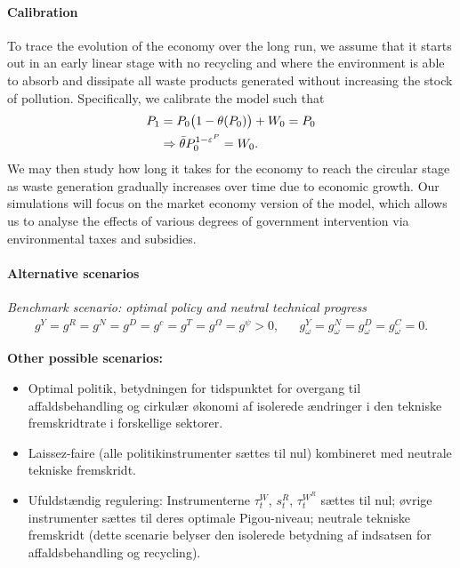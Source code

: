 \paragraph{Calibration}

To trace the evolution of the economy over the long run, we assume that it starts out in an early linear stage with no recycling and where the environment is able to absorb and dissipate all waste products generated without increasing the stock of pollution. Specifically, we calibrate the model such that
\begin{align}
P_1 &= P_0\bigl(1-\theta(P_0)\bigr) + W_0 = P_0
\notag \\
&\Rightarrow \bar\theta P_0^{1-\varepsilon^P} = W_0.
\label{eq:quant:calibration}
\end{align}
We may then study how long it takes for the economy to reach the circular stage as waste generation gradually increases over time due to economic growth. Our simulations will focus on the market economy version of the model, which allows us to analyse the effects of various degrees of government intervention via environmental taxes and subsidies.

\paragraph{Alternative scenarios}

\textit{Benchmark scenario: optimal policy and neutral technical progress}
\begin{align}
g^Y = g^R = g^N = g^D = g^c = g^T = g^\Omega = g^\psi > 0,
&&
g_\omega^Y = g_\omega^N = g_\omega^D = g_\omega^C = 0.
\label{eq:quant:benchmark}
\end{align}

\textbf{Other possible scenarios:}
\begin{itemize}
\item Optimal politik, betydningen for tidspunktet for overgang til affaldsbehandling og cirkul\ae r \o konomi af isolerede \ae ndringer i den tekniske fremskridtrate i forskellige sektorer.
\item Laissez-faire (alle politikinstrumenter s\ae ttes til nul) kombineret med neutrale tekniske fremskridt.
\item Ufuldst\ae ndig regulering: Instrumenterne $\tau_t^W$, $s_t^R$, $\tau_t^{W^R}$ s\ae ttes til nul; \o vrige instrumenter s\ae ttes til deres optimale Pigou-niveau; neutrale tekniske fremskridt (dette scenarie belyser den isolerede betydning af indsatsen for affaldsbehandling og recycling).
\end{itemize}

